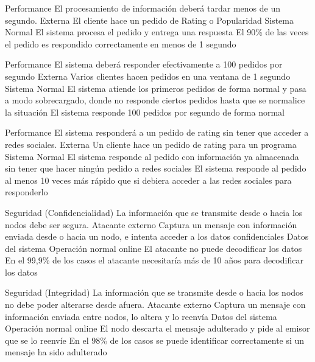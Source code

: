 \begin{enumerate}
\QA
  {Performance} %
  {El procesamiento de información deberá tardar menos de un segundo.} %
  {Externa} %
  {El cliente hace un pedido de Rating o Popularidad} %
  {Sistema} %
  {Normal} %
  {El sistema procesa el pedido y entrega una respuesta} %
  {El 90\% de las veces el pedido es respondido correctamente en menos de 1 segundo} %

\QA
  {Performance} %
  {El sistema deberá responder efectivamente a 100 pedidos por segundo} %
  {Externa} %
  {Varios clientes hacen pedidos en una ventana de 1 segundo} %
  {Sistema} %
  {Normal} %
  {El sistema atiende los primeros pedidos de forma normal y pasa a modo sobrecargado, donde no responde ciertos pedidos hasta que se normalice la situación} %
  {El sistema responde 100 pedidos por segundo de forma normal} %

\QA
  {Performance} %
  {El sistema responderá a un pedido de rating sin tener que acceder a redes sociales.} %
  {Externa} %
  {Un cliente hace un pedido de rating para un programa} %
  {Sistema} %
  {Normal} %
  {El sistema responde al pedido con información ya almacenada sin tener que hacer ningún pedido a redes sociales} %
  {El sistema responde al pedido al menos 10 veces más rápido que si debiera acceder a las redes sociales para responderlo} %



\QA
  {Seguridad (Confidencialidad)} %
  {La información que se transmite desde o hacia los nodos debe ser segura.} %
  {Atacante externo} %
  {Captura un mensaje con información enviada desde o hacia un nodo, e intenta acceder a los datos confidenciales} %
  {Datos del sistema} %
  {Operación normal online} %
  {El atacante no puede decodificar los datos} %
  {En el 99,9\% de los casos el atacante necesitaría más de 10 años para decodificar los datos} %

\QA
  {Seguridad (Integridad)} %
  {La información que se transmite desde o hacia los nodos no debe poder alterarse desde afuera.} %
  {Atacante externo} %
  {Captura un mensaje con información enviada entre nodos, lo altera y lo reenvía} %
  {Datos del sistema} %
  {Operación normal online} %
  {El nodo descarta el mensaje adulterado y pide al emisor que se lo reenvíe} %
  {En el 98\% de los casos se puede identificar correctamente si un mensaje ha sido adulterado} %


\end{enumerate}
